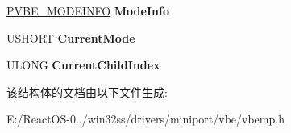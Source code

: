 \begin{DoxyCompactItemize}
\item 
\mbox{\label{struct_v_b_e___d_e_v_i_c_e___e_x_t_e_n_s_i_o_n_a10569dae60d1a8d12cc01815a7a5f756}} 
\hyperlink{struct_v_b_e___m_o_d_e_i_n_f_o}{P\+V\+B\+E\+\_\+\+M\+O\+D\+E\+I\+N\+FO} {\bfseries Mode\+Info}
\item 
\mbox{\label{struct_v_b_e___d_e_v_i_c_e___e_x_t_e_n_s_i_o_n_af60af7e6864e38a2e274fe5006a77495}} 
U\+S\+H\+O\+RT {\bfseries Current\+Mode}
\item 
\mbox{\label{struct_v_b_e___d_e_v_i_c_e___e_x_t_e_n_s_i_o_n_acd5acdf944dfb05a95ebe4576ef8d4fe}} 
U\+L\+O\+NG {\bfseries Current\+Child\+Index}
\end{DoxyCompactItemize}


该结构体的文档由以下文件生成\+:\begin{DoxyCompactItemize}
\item 
E\+:/\+React\+O\+S-\/0../win32ss/drivers/miniport/vbe/vbemp.\+h\end{DoxyCompactItemize}
